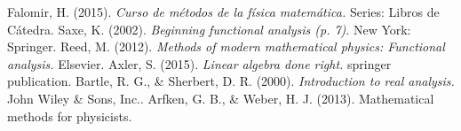 

\usepackage{fancyhdr}%
\pagestyle{fancy}%
\fancyhead{}
\fancyhead[R]{\footnotesize{\thepage}}
\fancyfoot{}
\usepackage{fourier-orns}

\renewcommand\footrule{%
\hrulefill
\raisebox{-2.1pt}
{\quad\decosix\quad}%
\hrulefill}
\newcommand{\inner}[2]{\langle #1 , #2 \rangle}
\newcommand{\metric}[2]{\rho(#1,#2)}	
\newcommand{\seque}[2]{\{ #1_{#2} \}}


\begin{titlepage}






\pagebreak


\begin{thebibliography}{00}
 Falomir, H. (2015). \textit{Curso de métodos de la física matemática.} Series: Libros de Cátedra.
 Saxe, K. (2002). \textit{Beginning functional analysis (p. 7)}. New York: Springer.
 Reed, M. (2012). \textit{Methods of modern mathematical physics: Functional analysis.} Elsevier.
 Axler, S. (2015). \textit{Linear algebra done right.} springer publication.
 Bartle, R. G., \& Sherbert, D. R. (2000). \textit{Introduction to real analysis.} John Wiley \& Sons, Inc..
 Arfken, G. B., \& Weber, H. J. (2013). Mathematical methods for physicists.
\end{thebibliography}



\end{titlepage}

